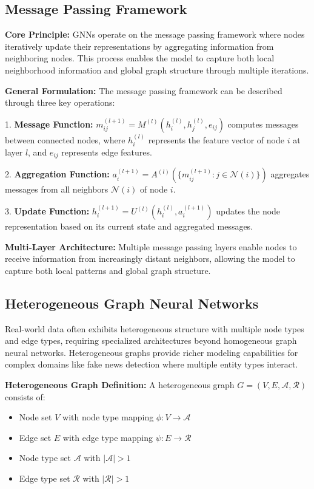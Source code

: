 \subsection{Message Passing Framework}

\textbf{Core Principle:} GNNs operate on the message passing framework where nodes iteratively update their representations by aggregating information from neighboring nodes. This process enables the model to capture both local neighborhood information and global graph structure through multiple iterations.

\textbf{General Formulation:} The message passing framework can be described through three key operations:

1. \textbf{Message Function:} $m_{ij}^{(l+1)} = M^{(l)}(h_i^{(l)}, h_j^{(l)}, e_{ij})$ computes messages between connected nodes, where $h_i^{(l)}$ represents the feature vector of node $i$ at layer $l$, and $e_{ij}$ represents edge features.

2. \textbf{Aggregation Function:} $a_i^{(l+1)} = A^{(l)}(\{m_{ij}^{(l+1)} : j \in \mathcal{N}(i)\})$ aggregates messages from all neighbors $\mathcal{N}(i)$ of node $i$.

3. \textbf{Update Function:} $h_i^{(l+1)} = U^{(l)}(h_i^{(l)}, a_i^{(l+1)})$ updates the node representation based on its current state and aggregated messages.

\textbf{Multi-Layer Architecture:} Multiple message passing layers enable nodes to receive information from increasingly distant neighbors, allowing the model to capture both local patterns and global graph structure.

\subsection{Heterogeneous Graph Neural Networks}

Real-world data often exhibits heterogeneous structure with multiple node types and edge types, requiring specialized architectures beyond homogeneous graph neural networks. Heterogeneous graphs provide richer modeling capabilities for complex domains like fake news detection where multiple entity types interact.

\textbf{Heterogeneous Graph Definition:} A heterogeneous graph $G = (V, E, \mathcal{A}, \mathcal{R})$ consists of:
\begin{itemize}
\item Node set $V$ with node type mapping $\phi: V \rightarrow \mathcal{A}$
\item Edge set $E$ with edge type mapping $\psi: E \rightarrow \mathcal{R}$  
\item Node type set $\mathcal{A}$ with $|\mathcal{A}| > 1$
\item Edge type set $\mathcal{R}$ with $|\mathcal{R}| > 1$
\end{itemize}

